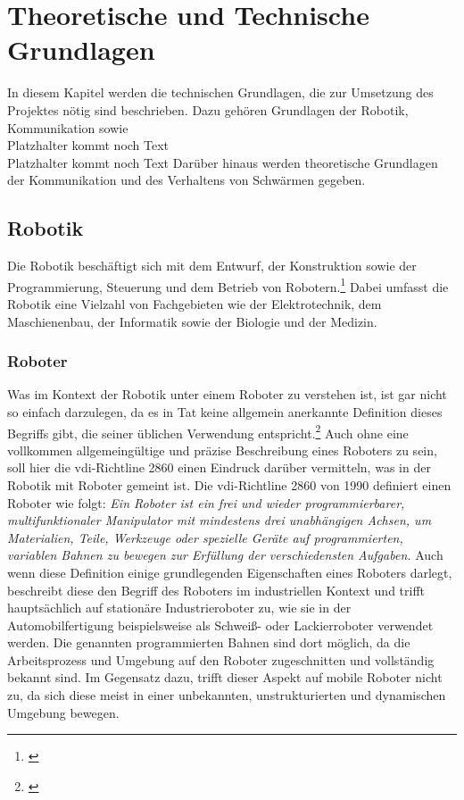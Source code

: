 \section{Theoretische und Technische Grundlagen}
In diesem Kapitel werden die technischen Grundlagen, die zur Umsetzung des Projektes nötig sind beschrieben.
Dazu gehören Grundlagen der Robotik, Kommunikation sowie 
\\Platzhalter kommt noch Text
\\Platzhalter kommt noch Text
Darüber hinaus werden theoretische Grundlagen der Kommunikation und des Verhaltens von Schwärmen gegeben.
\subsection{Robotik} %
Die Robotik beschäftigt sich mit dem Entwurf, der Konstruktion sowie der Programmierung, Steuerung und dem Betrieb 
von Robotern.\footnote{\citep[vgl.][Definition Robotik]{Bendel.DefinitionRobotik}\label{note1}} Dabei umfasst die Robotik eine Vielzahl 
von Fachgebieten wie der Elektrotechnik, dem Maschienenbau, der Informatik sowie der Biologie und der Medizin.
\subsubsection{Roboter}
Was im Kontext der Robotik unter einem Roboter zu verstehen ist, ist gar nicht so einfach darzulegen, da es in Tat keine allgemein anerkannte Definition dieses Begriffs gibt, die seiner üblichen Verwendung entspricht.\footnote{\citep[vgl.][Mobile Roboter, Seite 2]{Hertzberg.MobileRoboter}\label{note2}}
\newline
Auch ohne eine vollkommen allgemeingültige und präzise Beschreibung eines Roboters zu sein, soll hier die \gls{vdi}-Richtline 2860 einen Eindruck darüber vermitteln, was in der Robotik mit Roboter gemeint ist. \newline
Die \gls{vdi}-Richtline 2860 von 1990 definiert einen Roboter wie folgt:
\vspace{2mm}
\newline
\glqq{}\textit{Ein Roboter ist ein frei und wieder programmierbarer, multifunktionaler Manipulator mit mindestens drei unabhängigen Achsen, um Materialien, Teile, Werkzeuge oder spezielle Geräte auf programmierten,
variablen Bahnen zu bewegen zur Erfüllung der verschiedensten Aufgaben.}\grqq{}
\vspace{2mm}
\newline
Auch wenn diese Definition einige grundlegenden Eigenschaften eines Roboters darlegt, beschreibt diese den Begriff des Roboters im industriellen Kontext und trifft hauptsächlich auf stationäre Industrieroboter zu, wie sie in der Automobilfertigung beispielsweise als Schweiß- oder Lackierroboter verwendet werden. Die genannten programmierten Bahnen sind dort möglich, da die Arbeitsprozess und Umgebung auf den Roboter zugeschnitten und vollständig bekannt sind. \newline
Im Gegensatz dazu, trifft dieser Aspekt auf mobile Roboter nicht zu, da sich diese meist in einer unbekannten, unstrukturierten und dynamischen Umgebung bewegen.
